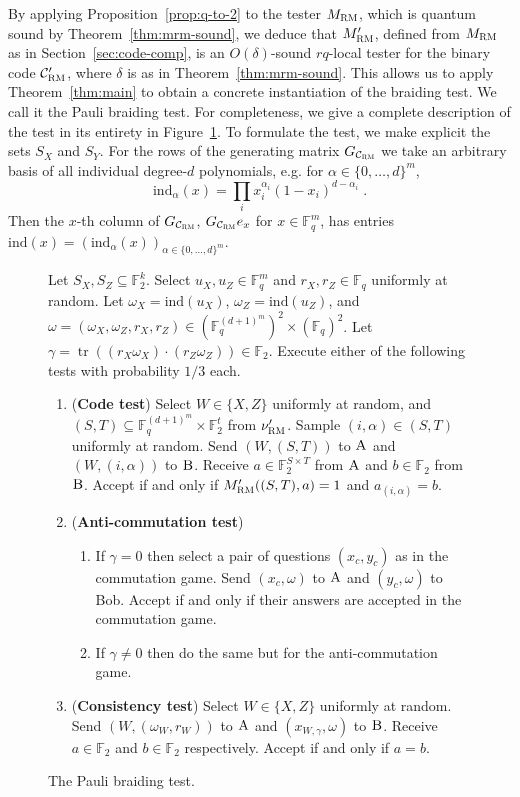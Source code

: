 \documentclass[11pt]{article}
\theoremstyle{definition}
\newcommand{\code}{\mathcal{C}}
\newcommand{\field}{\mathbb{F}_2}
\newcommand{\F}{\ensuremath{\mathbb{F}}}
\newcommand{\RM}{\ensuremath{\textsc{RM}}}
\newcommand{\ind}{\ensuremath{\mathrm{ind}}}
\DeclareMathOperator{\tr}{tr}
\newcommand{\labelstyle}[1]{\ensuremath{\textsc{#1}}\xspace}
\newcommand{\alice}{\labelstyle{A}}
\newcommand{\bob}{\labelstyle{B}}
\newenvironment{gamespec}{
  \begin{mdframed}[style=figstyle]}{
  \end{mdframed}}
\begin{document}
By applying Proposition~\ref{prop:q-to-2} to the tester $M_\RM$, which is quantum sound by Theorem~\ref{thm:mrm-sound}, we deduce that $M'_\RM$, defined from $M_\RM$ as in Section~\ref{sec:code-comp}, is an $O(\delta)$-sound $rq$-local tester for the binary code $\code'_{\RM}$, where $\delta$ is as in Theorem~\ref{thm:mrm-sound}. This allows us to apply Theorem~\ref{thm:main} to obtain a concrete instantiation of the braiding test. We call it the Pauli braiding test. For completeness, we give a complete description of the test in its entirety in Figure~\ref{fig:pauli-braiding}. To formulate the test, we make explicit the sets $S_X$ and $S_Y$. For the rows of the generating matrix $G_{\code_\RM}$ we take an arbitrary basis of all individual degree-$d$ polynomials, e.g. for $\alpha \in \{0,\ldots,d\}^m$, 
\[ \ind_{\alpha}(x) = \prod_{i} x_i^{\alpha_i} (1-x_i)^{d-\alpha_i}\;.\]
Then the $x$-th column of $G_{\code_\RM}$, $G_{\code_{\RM}}e_x$ for $x\in \F_q^m$, has entries $\ind(x)=(\ind_{\alpha}(x))_{\alpha\in\{0,\ldots,d\}^m}$.

\begin{figure}[!htbp]
  \centering
  \begin{gamespec}
Let $S_X,S_Z\subseteq \field^k$.  Select $u_X,u_Z \in \F_q^m$ and $r_X,r_Z\in \F_q$ uniformly at random. Let $\omega_X = \ind(u_X)$, $\omega_Z=\ind(u_Z)$, and  $\omega = (\omega_X,\omega_Z,r_X,r_Z)\in (\F_q^{(d+1)^m})^2 \times (\F_q)^2$. Let 
$\gamma = \tr((r_X\omega_X) \cdot (r_Z\omega_Z)) \in \F_2$.
 Execute either of the following tests with probability $1/3$ each. 
\begin{enumerate}
      \setlength\itemsep{1pt}
    \item (\textbf{Code test}) Select $W\in \{X,Z\}$ uniformly at random, and $(S,T)\subseteq \F_q^{(d+1)^m} \times \F_2^t$ from $\nu'_\RM$. Sample $(i,\alpha)\in (S,T)$ uniformly at random. Send $(W,(S,T))$ to $\alice$ and $(W,(i,\alpha))$ to $\bob$. Receive $a\in \F_2^{S\times T}$ from $\alice$ and $b\in \F_2$ from $\bob$. Accept if and only if $M'_\RM((S,T),a)=1$ and $a_{(i,\alpha)} = b$.  
    \item (\textbf{Anti-commutation test}) 
		\begin{enumerate}
		\item If $\gamma=0$ then select a pair of questions $(x_c,y_c)$ as in the commutation game. Send $(x_c,\omega)$ to $\alice$ and $(y_c,\omega)$ to Bob. Accept if and only if their answers are accepted in the commutation game. 
		\item If $\gamma\neq 0$ then do the same but for the anti-commutation game. 
		\end{enumerate} 
		 \item (\textbf{Consistency test}) Select $W\in \{X,Z\}$ uniformly at random. Send $(W,(\omega_W,r_W))$ to $\alice$ and $(x_{W,\gamma},\omega)$ to $\bob$. Receive $a\in \F_2$ and $b\in \F_2$ respectively. Accept if and only if $a=b$. 
    \end{enumerate}
  \end{gamespec}
  \caption{The Pauli braiding test.}
  \label{fig:pauli-braiding}
\end{figure}
\end{document}

